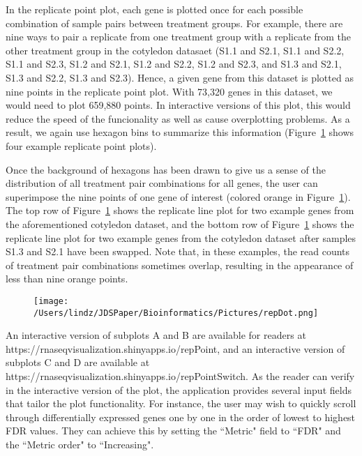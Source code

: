 \documentclass[useAMS,referee]{biom}
\begin{document}
In the replicate point plot, each gene is plotted once for each possible combination of sample pairs between treatment groups. For example, there are nine ways to pair a replicate from one treatment group with a replicate from the other treatment group in the cotyledon datasaet (S1.1 and S2.1, S1.1 and S2.2, S1.1 and S2.3, S1.2 and S2.1, S1.2 and S2.2, S1.2 and S2.3, and S1.3 and S2.1, S1.3 and S2.2, S1.3 and S2.3). Hence, a given gene from this dataset is plotted as nine points in the replicate point plot. With 73,320 genes in this dataset, we would need to plot 659,880 points. In interactive versions of this plot, this would reduce the speed of the funcionality as well as cause overplotting problems. As a result, we again use hexagon bins to summarize this information (Figure~\ref{repDot} shows four example replicate point plots).

Once the background of hexagons has been drawn to give us a sense of the distribution of all treatment pair combinations for all genes, the user can superimpose the nine points of one gene of interest (colored orange in Figure~\ref{repDot}). The top row of Figure~\ref{repDot} shows the replicate line plot for two example genes from the aforementioned cotyledon dataset, and the bottom row of Figure~\ref{repDot} shows the replicate line plot for two example genes from the cotyledon dataset after samples S1.3 and S2.1 have been swapped. Note that, in these examples, the read counts of treatment pair combinations sometimes overlap, resulting in the appearance of less than nine orange points.

\begin{figure}
\begin{center}
\centerline{\texttt{[image: /Users/lindz/JDSPaper/Bioinformatics/Pictures/repDot.png]}}
\end{center}
\caption{
\label{repDot}}
\end{figure}

An interactive version of subplots A and B are available for readers at https://rnaseqvisualization.shinyapps.io/repPoint, and an interactive version of subplots C and D are available at https://rnaseqvisualization.shinyapps.io/repPointSwitch. As the reader can verify in the interactive version of the plot, the application provides several input fields that tailor the plot functionality. For instance, the user may wish to quickly scroll through differentially expressed genes one by one in the order of lowest to highest FDR values. They can achieve this by setting the ``Metric" field to ``FDR" and the ``Metric order" to ``Increasing". 
\end{document}
